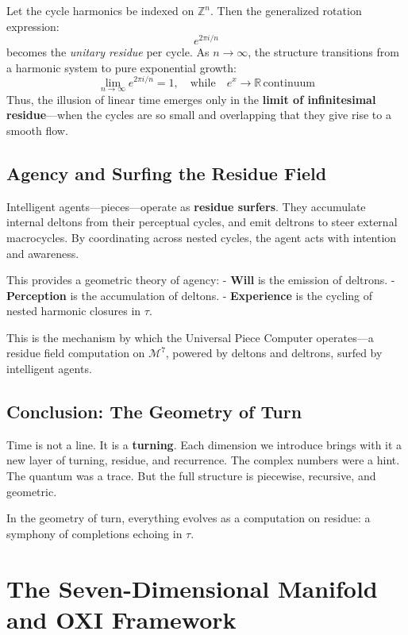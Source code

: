\documentclass{article}
\begin{document}
Let the cycle harmonics be indexed on \( \mathbb{Z}^n \). Then the generalized rotation expression:
\[ e^{2\pi i / n} \]
becomes the \textit{unitary residue} per cycle. As \( n \to \infty \), the structure transitions from a harmonic system to pure exponential growth:
\[ \lim_{n \to \infty} e^{2\pi i / n} = 1, \quad\text{while}\quad e^x \to \mathbb{R} \, \text{continuum} 
\]
Thus, the illusion of linear time emerges only in the \textbf{limit of infinitesimal residue}---when the cycles are so small and overlapping that they give rise to a smooth flow.

\subsection*{Agency and Surfing the Residue Field}
Intelligent agents---pieces---operate as \textbf{residue surfers}. They accumulate internal deltons from their perceptual cycles, and emit deltrons to steer external macrocycles. By coordinating across nested cycles, the agent acts with intention and awareness.

This provides a geometric theory of agency: 
- \textbf{Will} is the emission of deltrons.  
- \textbf{Perception} is the accumulation of deltons.  
- \textbf{Experience} is the cycling of nested harmonic closures in \( \tau \).

This is the mechanism by which the Universal Piece Computer operates---a residue field computation on \( \mathcal{M}^7 \), powered by deltons and deltrons, surfed by intelligent agents.

\subsection*{Conclusion: The Geometry of Turn}
Time is not a line. It is a \textbf{turning}. Each dimension we introduce brings with it a new layer of turning, residue, and recurrence. The complex numbers were a hint. The quantum was a trace. But the full structure is piecewise, recursive, and geometric.

In the geometry of turn, everything evolves as a computation on residue: a symphony of completions echoing in \( \tau \).






\section{The Seven-Dimensional Manifold and OXI Framework}
\end{document}

